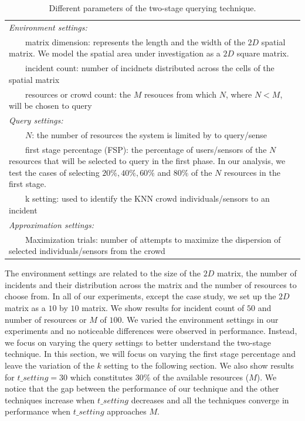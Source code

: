 \documentclass{acm_proc_article-sp}
\newcommand{\tabitem}{~~\llap{\textbullet}~~}
\begin{document}
\begin{table}{}
\centering
\begin{tabulary}{0.5\textwidth}{|L|}
\hline
\textit{Environment settings: }\\
\tabitem matrix dimension: represents the length and 
the width of the $2D$ spatial matrix. We model the spatial area under investigation as a $2D$ square matrix.\\
\tabitem incident count: number of incidnets distributed across the cells of the spatial matrix\\
\tabitem resources or crowd count: the $M$ resouces from which $N$, where $N < M$, will be chosen to query\\
\hline
\textit{Query settings:}\\
\tabitem $N$: the number of resources the system is limited by to query/sense \\
\tabitem first stage percentage (FSP): the percentage of users/sensors of the $N$ resources that will be selected to query in the first phase. In our analysis, we test the cases of selecting $20\%, 40\%, 60\%$ and $80\%$ of the $N$ resources in the first stage.\\
\tabitem k setting: used to identify the KNN crowd individuals/sensors to an incident\\
\hline
\textit{Approximation settings: }\\
\tabitem Maximization trials: number of attempts to maximize the dispersion of selected individuals/sensors from the crowd\\
\hline
\end{tabulary}  
\caption{Different parameters of the two-stage querying technique.}
\label{table:systemParameters}
\end{table}

The environment settings are related to the size of the $2D$ matrix, the number of incidents and their distribution across the matrix and the number of resources to choose from. In all of our experiments, except the case study, we set up the $2D$ matrix as a $10$ by $10$ matrix. We show results for incident count of $50$ and  number of resources or $M$ of $100$. We varied the environment settings in our experiments and no noticeable differences were observed in performance. Instead, we focus on varying the query settings to better understand the two-stage technique. In this section, we will focus on varying the first stage percentage and leave the variation of the $k$ setting to the following section. We also show results for $t\_setting = 30$ which constitutes $30\%$ of the available resources ($M$). We notice that the gap between the performance of our technique and the other techniques increase when $t\_setting$ decreases and all the techniques converge in performance when $t\_setting$ approaches $M$. \par
  
\end{document}
